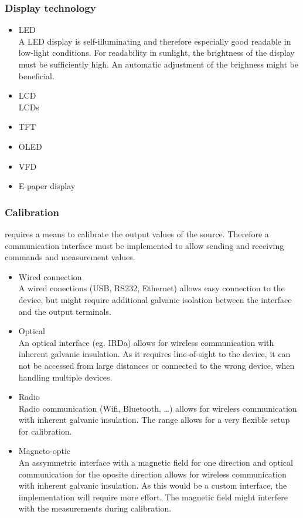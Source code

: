 \subsubsection{Display technology}
\begin{itemize}
     \item \acs{LED}
        \\
        A \ac{LED} display is self-illuminating and therefore especially good readable in low-light conditions. For readability in sunlight, the brightness of the display must be sufficiently high. An automatic adjustment of the brighness might be beneficial. 
    \item \acs{LCD}
        \\
        \acp{LCD}
    \item \acs{TFT}
        \\
    \item \acs{OLED}
        \\
    \item \acs{VFD}
        \\
    \item E-paper display
        \\
\end{itemize}

\subsubsection{Calibration}
 requires a means to calibrate the output values of the source. Therefore a communication interface must be implemented to allow sending and receiving commands and measurement values. 

\begin{itemize}
    \item Wired connection
        \\
        A wired conections (\ac{USB}, RS232, Ethernet) allows easy connection to the device, but might require additional galvanic isolation between the interface and the output terminals. 
    \item Optical
        \\
        An optical interface (eg. IRDa) allows for wireless communication with inherent galvanic insulation. As it requires line-of-sight to the device, it can not be accessed from large distances or connected to the wrong device, when handling multiple devices. 
    \item Radio
        \\
        Radio communication (Wifi, Bluetooth, \ldots) allows for wireless communication with inherent galvanic insulation. The range allows for a very flexible setup for calibration. 
    \item Magneto-optic
        \\
        An assymmetric interface with a magnetic field for one direction and optical communication for the oposite direction allows for wireless communication with inherent galvanic insulation. As this would be a custom interface, the implementation will require more effort. The magnetic field might interfere with the measurements during calibration. 
\end{itemize}

